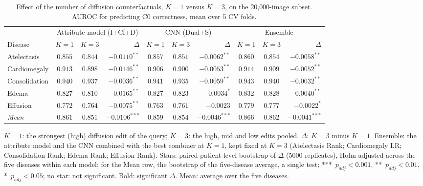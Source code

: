\begin{table}[htbp]
\centering
\small
\caption{Effect of the number of diffusion counterfactuals, $K=1$ versus $K=3$, on the 20{,}000-image subset. AUROC for predicting C0 correctness, mean over 5 CV folds.}
\label{tab:k_diffusion_sub20k}
\begin{threeparttable}
\begin{tabular}{l|ccr|ccr|ccr}
\toprule
 & \multicolumn{3}{c|}{Attribute model (I+Cf+D)} & \multicolumn{3}{c|}{CNN (Dual+S)} & \multicolumn{3}{c}{Ensemble} \\
\cmidrule(lr){2-4} \cmidrule(lr){5-7} \cmidrule(l){8-10}
Disease & $K{=}1$ & $K{=}3$ & $\Delta$ & $K{=}1$ & $K{=}3$ & $\Delta$ & $K{=}1$ & $K{=}3$ & $\Delta$ \\
\midrule
Atelectasis & $0.855$ & $0.844$ & $\mathbf{-0.0110}^{**}$ & $0.857$ & $0.851$ & $\mathbf{-0.0062}^{**}$ & $0.860$ & $0.854$ & $\mathbf{-0.0058}^{**}$ \\
Cardiomegaly & $0.913$ & $0.898$ & $\mathbf{-0.0146}^{**}$ & $0.906$ & $0.900$ & $\mathbf{-0.0053}^{**}$ & $0.914$ & $0.909$ & $\mathbf{-0.0052}^{**}$ \\
Consolidation & $0.940$ & $0.937$ & $\mathbf{-0.0036}^{**}$ & $0.941$ & $0.935$ & $\mathbf{-0.0059}^{**}$ & $0.943$ & $0.940$ & $\mathbf{-0.0032}^{**}$ \\
Edema & $0.827$ & $0.810$ & $\mathbf{-0.0165}^{**}$ & $0.827$ & $0.823$ & $\mathbf{-0.0034}^{*}$ & $0.832$ & $0.828$ & $\mathbf{-0.0040}^{**}$ \\
Effusion & $0.772$ & $0.764$ & $\mathbf{-0.0075}^{**}$ & $0.763$ & $0.761$ & $-0.0023$ & $0.779$ & $0.777$ & $\mathbf{-0.0022}^{*}$ \\
\midrule
\textit{Mean} & $0.861$ & $0.851$ & $\mathbf{-0.0106}^{***}$ & $0.859$ & $0.854$ & $\mathbf{-0.0046}^{***}$ & $0.866$ & $0.862$ & $\mathbf{-0.0041}^{***}$ \\
\bottomrule
\end{tabular}
\begin{tablenotes}\footnotesize
\item $K=1$: the strongest (high) diffusion edit of the query; $K=3$: the high, mid and low edits pooled. $\Delta$: $K=3$ minus $K=1$. Ensemble: the attribute model and the CNN combined with the best combiner at $K=1$, kept fixed at $K=3$ (Atelectasis Rank; Cardiomegaly LR; Consolidation Rank; Edema Rank; Effusion Rank). Stars: paired patient-level bootstrap of $\Delta$ (5000 replicates), Holm-adjusted across the five diseases within each model; for the Mean row, the bootstrap of the five-disease average, a single test; ***~$p_{adj} < 0.001$, **~$p_{adj} < 0.01$, *~$p_{adj} < 0.05$; no star: not significant. Bold: significant $\Delta$. Mean: average over the five diseases.
\end{tablenotes}
\end{threeparttable}
\end{table}
